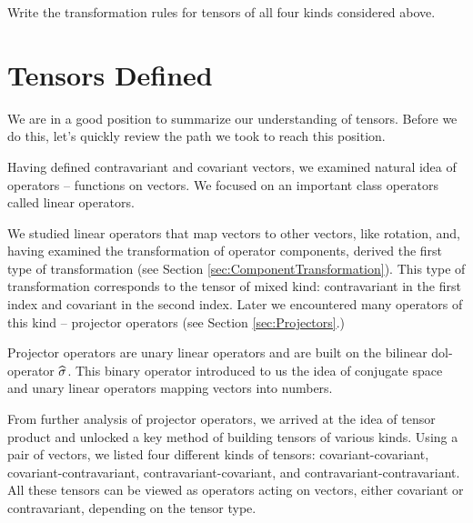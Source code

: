 \begin{exercise}\label{exe:transformation4Kinds}
  Write the transformation rules for tensors of all four kinds
  considered above.
\end{exercise}

\section{Tensors Defined}
We are in a good position to summarize our understanding of
tensors. Before we do this, let's quickly review the path we took to
reach this position.

Having defined contravariant and covariant vectors, we examined
natural idea of operators -- functions on vectors. We focused on an
important class operators called linear operators.

We studied linear operators that map vectors to other vectors, like
rotation, and, having examined the transformation of operator
components, derived the first type of transformation (see Section
\ref{sec:ComponentTransformation}). This type of
transformation corresponds to the tensor of mixed kind: contravariant
in the first index and covariant in the second index. Later we
encountered many operators of this kind -- projector operators (see
Section \ref{sec:Projectors}.)

Projector operators are unary linear operators and are built on the
bilinear dol-operator $\widehat{\sigma}$. This binary operator
introduced to us the idea of conjugate space and unary linear
operators mapping vectors into numbers.

From further analysis of projector operators, we arrived at
the idea of tensor product and unlocked a key method of building
tensors of various kinds. Using a pair of vectors, we listed four
different kinds of tensors: covariant-covariant,
covariant-contravariant, contravariant-covariant, and
contravariant-contravariant. All these tensors can be viewed as
operators acting on vectors, either covariant or contravariant,
depending on the tensor type.

